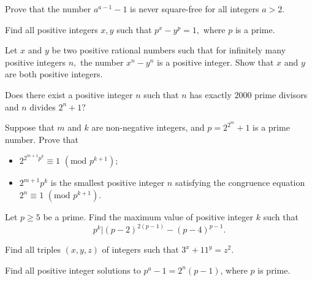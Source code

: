 \documentclass{subfile}
\begin{document}
	\begin{problem}
		Prove that the number $a^{a-1}-1$ is never square-free for all integers $a>2$.
	\end{problem}
	
	\begin{problem} 
		Find all positive integers $x,y$ such that $p^x - y^p=1,$ where $p$ is a prime.
	\end{problem}
	
	
	
	\begin{problem} 
		Let $x$ and $y$ be two positive rational numbers such that for infinitely many positive integers $n,$ the number $x^n-y^n$ is a positive integer. Show that $x$ and $y$ are both positive integers.
	\end{problem} 
	
	\begin{problem}[IMO 2000]
		Does there exist a positive integer $n$ such that $n$ has exactly $2000$ prime divisors and $n$ divides $2^n + 1?$
	\end{problem} 
	
	\begin{problem}
		Suppose that $m$ and $k$ are non-negative integers, and $p = 2^{2^m}+1$ is a prime number. Prove that
		\begin{itemize}
			\item $2^{2^{m+1}p^k} \equiv 1$ $(\text{mod } p^{k+1})$;
			\item $2^{m+1}p^k$ is the smallest positive integer $n$ satisfying the congruence equation $2^n \equiv 1$ $(\text{mod } p^{k+1})$.
		\end{itemize}
	\end{problem} 
	
	\begin{problem}
		Let $p \geq 5$ be a prime. Find the maximum value of positive integer $k$ such that
		\[p^{k}|(p-2)^{2(p-1)}-(p-4)^{p-1}.\]
	\end{problem} 
	

	
	\begin{problem} %
		Find all triples $(x,y,z)$ of integers such that $3^x+11^y=z^2$.
	\end{problem}

	\begin{problem} %
		Find all positive integer solutions to $p^a-1=2^n(p-1)$, where $p$ is prime.
	\end{problem}
\end{document}
